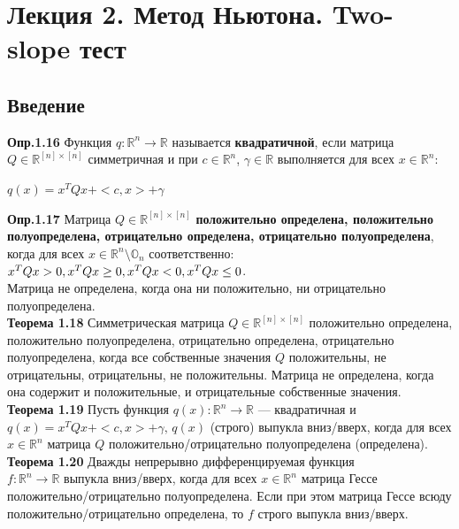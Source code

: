 \section{Лекция 2. Метод Ньютона. Two-slope тест}
\subsection{Введение}
{\bf Опр.1.16}
Функция $q:\mathbb{R}^n \to \mathbb{R}$ называется {\bf квадратичной}, если матрица $Q \in \mathbb{R}^{[n]\times[n]}$ симметричная и при $c \in \mathbb{R}^n$, $\gamma \in \mathbb{R}$ выполняется для всех $x \in \mathbb{R}^n$:
\begin{center} $q(x)=x^TQx+<c,x>+\gamma$ \end{center}

{\bf Опр.1.17}
Матрица $Q \in \mathbb{R}^{[n]\times[n]}$ {\bf положительно определена, положительно полуопределена, отрицательно определена, отрицательно полуопределена}, когда для всех $x \in \mathbb{R}^n \setminus \mathbb{O}_n$ соответственно:\\
$x^TQx>0,\\ x^TQx \ge 0,\\ x^TQx<0,\\ x^TQx \le 0$.\\ Матрица не определена, когда она ни положительно, ни отрицательно полуопределена.\\

{\bf Теорема 1.18}
Симметрическая матрица $Q \in \mathbb{R}^{[n]\times[n]}$ положительно определена, положительно полуопределена, отрицательно определена, отрицательно полуопределена, когда все собственные значения $Q$ положительны, не отрицательны, отрицательны, не положительны. Матрица не определена, когда она содержит и положительные, и отрицательные собственные значения.\\

{\bf Теорема 1.19}
Пусть функция $q(x):\mathbb{R}^n \to \mathbb{R}$ --- квадратичная и  $q(x)=x^TQx+<c,x>+\gamma \text{, } q(x)$ (строго) выпукла вниз/вверх, когда для всех
 $x \in \mathbb{R}^n$ матрица $Q$ положительно/отрицательно полуопределена (определена).\\

{\bf Теорема 1.20}
Дважды непрерывно дифференцируемая функция\\ $f:\mathbb{R}^n \to \mathbb{R}$ выпукла вниз/вверх, когда для всех $x \in \mathbb{R}^n$ матрица Гессе положительно/отрицательно полуопределена. Если при этом матрица Гессе всюду положительно/отрицательно определена, то $f$ строго выпукла вниз/вверх.\\


